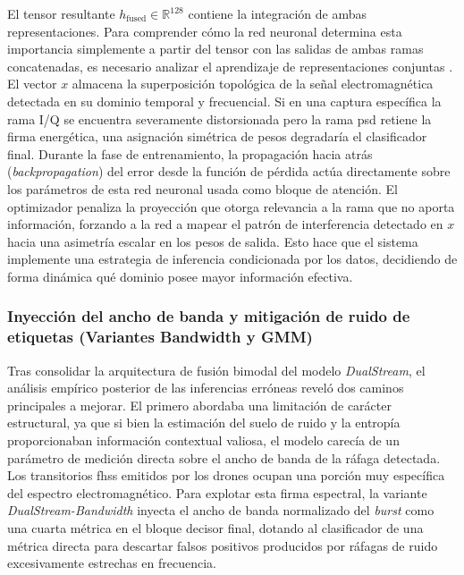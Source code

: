El tensor resultante $h_{\text{fused}} \in \mathbb{R}^{128}$ contiene la integración de ambas representaciones. Para comprender cómo la red neuronal determina esta importancia simplemente a partir del tensor con las salidas de ambas ramas concatenadas, es necesario analizar el aprendizaje de representaciones conjuntas \cite{baltrusaitis_multimodal_2018, woo_cbam_2018}. El vector $x$ almacena la superposición topológica de la señal electromagnética detectada en su dominio temporal y frecuencial. Si en una captura específica la rama I/Q se encuentra severamente distorsionada pero la rama \gls{psd} retiene la firma energética, una asignación simétrica de pesos degradaría el clasificador final. Durante la fase de entrenamiento, la propagación hacia atrás (\textit{backpropagation}) del error desde la función de pérdida actúa directamente sobre los parámetros de esta red neuronal usada como bloque de atención. El optimizador penaliza la proyección que otorga relevancia a la rama que no aporta información, forzando a la red a mapear el patrón de interferencia detectado en $x$ hacia una asimetría escalar en los pesos de salida. Esto hace que el sistema implemente una estrategia de inferencia condicionada por los datos, decidiendo de forma dinámica qué dominio posee mayor información efectiva.

\subsubsection{Inyección del ancho de banda y mitigación de ruido de etiquetas (Variantes Bandwidth y GMM)}
Tras consolidar la arquitectura de fusión bimodal del modelo \textit{DualStream}, el análisis empírico posterior de las inferencias erróneas reveló dos caminos principales a mejorar. El primero abordaba una limitación de carácter estructural, ya que si bien la estimación del suelo de ruido y la entropía proporcionaban información contextual valiosa, el modelo carecía de un parámetro de medición directa sobre el ancho de banda de la ráfaga detectada. Los transitorios \gls{fhss} emitidos por los drones ocupan una porción muy específica del espectro electromagnético. Para explotar esta firma espectral, la variante \textit{DualStream-Bandwidth} inyecta el ancho de banda normalizado del \textit{burst} como una cuarta métrica en el bloque decisor final, dotando al clasificador de una métrica directa para descartar falsos positivos producidos por ráfagas de ruido excesivamente estrechas en frecuencia.

